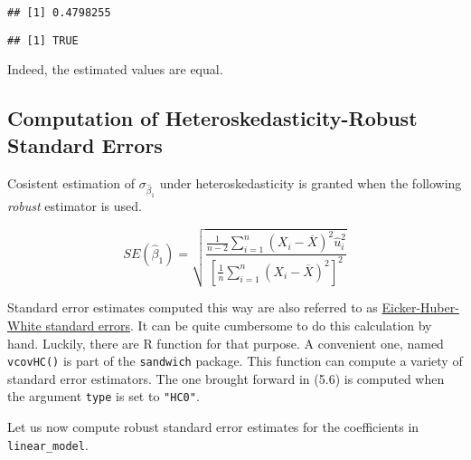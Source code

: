 \documentclass[]{book}
\newenvironment{Shaded}{\begin{snugshade}}{\end{snugshade}}
\newcommand{\KeywordTok}[1]{\textcolor[rgb]{0.13,0.29,0.53}{\textbf{#1}}}
\newcommand{\DecValTok}[1]{\textcolor[rgb]{0.00,0.00,0.81}{#1}}
\newcommand{\FloatTok}[1]{\textcolor[rgb]{0.00,0.00,0.81}{#1}}
\newcommand{\StringTok}[1]{\textcolor[rgb]{0.31,0.60,0.02}{#1}}
\newcommand{\CommentTok}[1]{\textcolor[rgb]{0.56,0.35,0.01}{\textit{#1}}}
\newcommand{\OperatorTok}[1]{\textcolor[rgb]{0.81,0.36,0.00}{\textbf{#1}}}
\newcommand{\NormalTok}[1]{#1}
\theoremstyle{definition}
\theoremstyle{definition}
\theoremstyle{definition}
\theoremstyle{remark}
\begin{document}
\begin{verbatim}
## [1] 0.4798255
\end{verbatim}

\begin{Shaded}
\end{Shaded}

\begin{verbatim}
## [1] TRUE
\end{verbatim}

Indeed, the estimated values are equal.

\subsection*{Computation of Heteroskedasticity-Robust Standard
Errors}\label{computation-of-heteroskedasticity-robust-standard-errors}

Cosistent estimation of \(\sigma_{\hat{\beta}_1}\) under
heteroskedasticity is granted when the following \emph{robust} estimator
is used.

\[ SE(\hat{\beta}_1) = \sqrt{ \frac{ \frac{1}{n-2} \sum_{i=1}^n (X_i - \overline{X})^2 \hat{u}_i^2 }{ \left[ \frac{1}{n} \sum_{i=1}^n (X_i - \overline{X})^2  \right]^2} } \tag{5.6} \]

Standard error estimates computed this way are also referred to as
\href{https://en.wikipedia.org/wiki/Heteroscedasticity-consistent_standard_errors}{Eicker-Huber-White
standard errors}. It can be quite cumbersome to do this calculation by
hand. Luckily, there are R function for that purpose. A convenient one,
named \texttt{vcovHC()} is part of the \texttt{sandwich} package. This
function can compute a variety of standard error estimators. The one
brought forward in (5.6) is computed when the argument \texttt{type} is
set to \texttt{"HC0"}.

Let us now compute robust standard error estimates for the coefficients
in \texttt{linear\_model}.
\end{document}

